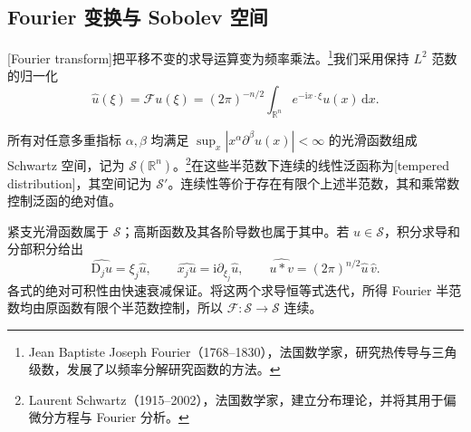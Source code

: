 \subsection{Fourier 变换与 Sobolev 空间}
\label{g3:subsec:1202:03}
[Fourier transform]把平移不变的求导运算变为频率乘法。\footnote{Jean Baptiste Joseph Fourier（1768--1830），法国数学家，研究热传导与三角级数，发展了以频率分解研究函数的方法。}我们采用保持 \(L^2\) 范数的归一化
\begin{equation}\label{g3:eq:fourier-normalization}
	\widehat u(\xi)=\mathcal Fu(\xi)
	=(2\pi)^{-n/2}\int_{\mathbb R^n}e^{-\mathrm ix\cdot\xi}u(x)\,\mathrm dx.
\end{equation}

\begin{definition}\label{g3:def:schwartz-tempered}
	所有对任意多重指标 \(\alpha,\beta\) 均满足 \(\sup_x|x^\alpha\partial^\beta u(x)|<\infty\) 的光滑函数组成 Schwartz 空间，记为 \(\mathcal S(\mathbb R^n)\)。\footnote{Laurent Schwartz（1915--2002），法国数学家，建立分布理论，并将其用于偏微分方程与 Fourier 分析。}在这些半范数下连续的线性泛函称为[tempered distribution]，其空间记为 \(\mathcal S'\)。连续性等价于存在有限个上述半范数，其和乘常数控制泛函的绝对值。
\end{definition}

紧支光滑函数属于 \(\mathcal S\)；高斯函数及其各阶导数也属于其中。若 \(u\in\mathcal S\)，积分求导和分部积分给出
\[
	\widehat{\mathrm D_j u}=\xi_j\widehat u,
	\qquad \widehat{x_ju}=\mathrm i\partial_{\xi_j}\widehat u,
	\qquad \widehat{u*v}=(2\pi)^{n/2}\widehat u\,\widehat v.
\]
各式的绝对可积性由快速衰减保证。将这两个求导恒等式迭代，所得 Fourier 半范数均由原函数有限个半范数控制，所以 \(\mathcal F:\mathcal S\to\mathcal S\) 连续。


